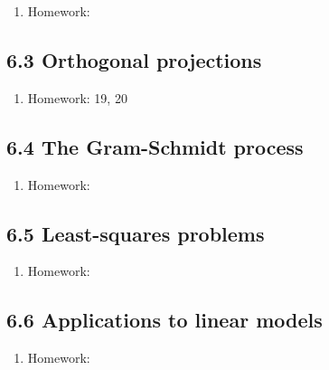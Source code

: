\documentclass{article}
\begin{document}
\begin{enumerate}

\item Homework: 

\end{enumerate}

\subsection{6.3 Orthogonal projections}

\begin{enumerate}

\item Homework: 19, 20

\end{enumerate}

\subsection{6.4 The Gram-Schmidt process}

\begin{enumerate}

\item Homework: 

\end{enumerate}

\subsection{6.5 Least-squares problems}

\begin{enumerate}

\item Homework: 

\end{enumerate}

\subsection{6.6 Applications to linear models}

\begin{enumerate}

\item Homework: 

\end{enumerate}
\end{document}
